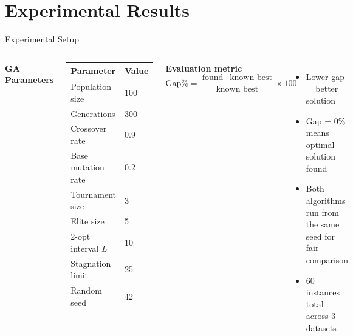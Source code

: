 \documentclass{beamer}
\begin{document}
\section{Experimental Results}

\begin{frame}{Experimental Setup}
  \begin{columns}
    \textbf{GA Parameters}
    \begin{center}
    \begin{tabular}{ll}
      \toprule
      Parameter & Value \\
      \midrule
      Population size     & 100  \\
      Generations         & 300  \\
      Crossover rate      & 0.9  \\
      Base mutation rate  & 0.2  \\
      Tournament size     & 3    \\
      Elite size          & 5    \\
      2-opt interval $L$  & 10   \\
      Stagnation limit    & 25   \\
      Random seed         & 42   \\
      \bottomrule
    \end{tabular}
    \end{center}

    \textbf{Evaluation metric}
    \[
      \text{Gap\%} = \frac{\text{found} - \text{known best}}{\text{known best}} \times 100
    \]
    \begin{itemize}
      \item Lower gap = better solution
      \item Gap = 0\% means optimal solution found
      \item Both algorithms run from the same seed for fair comparison
      \item 60 instances total across 3 datasets
    \end{itemize}
  \end{columns}
\end{frame}
\end{document}
